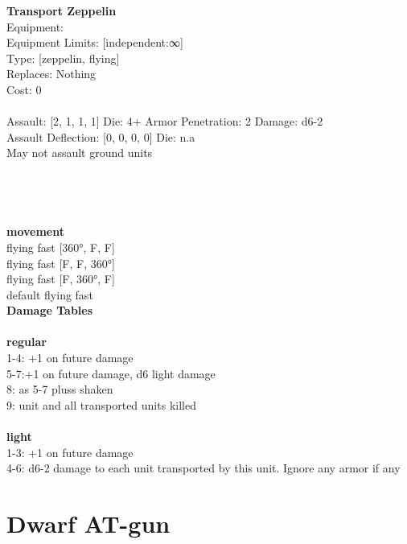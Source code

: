 {\bf Transport Zeppelin } \\
Equipment:  \\
Equipment Limits: [independent:∞] \\
Type: [zeppelin, flying] \\
Replaces: Nothing \\
Cost: 0\\
\ \\
Assault: [2, 1, 1, 1] Die: 4+ Armor Penetration: 2 Damage: d6-2 \\
Assault Deflection: [0, 0, 0, 0] Die: n.a\\
\indent May not assault ground units\\ 
 
\ \\

\ \\
 
\ \\



\ \\ {\bf movement } \\
flying fast [360°, F, F] \\
flying fast [F, F, 360°] \\
flying fast [F, 360°, F] \\
default flying fast \\


{\bf Damage Tables} \\
\ \\ {\bf regular } \\
1-4: +1 on future damage \\
5-7:+1 on future damage, d6 light damage \\
8: as 5-7 pluss shaken \\
9: unit and all transported units killed \\
\ \\ {\bf light } \\
1-3: +1 on future damage \\
4-6: d6-2 damage to each unit transported by this unit. Ignore any armor if any \\










\pagebreak\pagebreak

\section{ Dwarf AT-gun }

